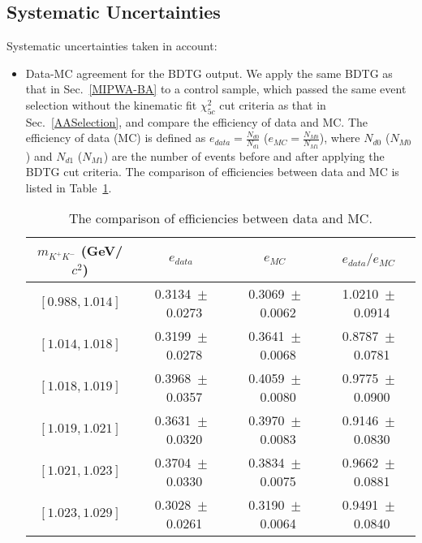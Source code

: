 \subsection{Systematic Uncertainties}
\label{MIPWA-SYS}
\par{
    Systematic uncertainties taken in account:
    \begin{itemize}
        \item \uppercase\expandafter{} Data-MC agreement for the BDTG output. 
            We apply the same BDTG as that in Sec.~\ref{MIPWA-BA} to a control sample, which passed the same event selection without the kinematic fit $\chi_{5c}^{2}$ cut criteria as that in Sec.~\ref{AASelection}, and compare the efficiency of data and MC.
            The efficiency of data (MC) is defined as $e_{data} = \frac{N_{d0}}{N_{d1}}$ ($e_{MC} = \frac{N_{M0}}{N_{M1}}$), where $N_{d0}$ ($N_{M0}$) and $N_{d1}$ ($N_{M1}$) are the number of events before and after applying the BDTG cut criteria.
            The comparison of efficiencies between data and MC is listed in Table~\ref{BDTG-SYS}.
            \begin{table}[htbp]
                \caption{The comparison of efficiencies between data and MC.}
                \label{BDTG-SYS}
                \begin{center}
                    \begin{tabular}{cccc}
                        \toprule\toprule
                        $m_{K^{+}K^{-}}$ (GeV/$c^{2}$) &  $e_{data} $ &  $e_{MC}$&  $e_{data} / e_{MC}$   \\
                        \hline
                        $[0.988, 1.014]$ &                0.3134\ $\pm$\ 0.0273 & 0.3069\ $\pm$\ 0.0062 & 1.0210\ $\pm$\ 0.0914 \\  
                        $[1.014, 1.018]$ &                0.3199\ $\pm$\ 0.0278 & 0.3641\ $\pm$\ 0.0068 & 0.8787\ $\pm$\ 0.0781 \\
                        $[1.018, 1.019]$ &                0.3968\ $\pm$\ 0.0357 & 0.4059\ $\pm$\ 0.0080 & 0.9775\ $\pm$\ 0.0900 \\
                        $[1.019, 1.021]$ &                0.3631\ $\pm$\ 0.0320 & 0.3970\ $\pm$\ 0.0083 & 0.9146\ $\pm$\ 0.0830 \\
                        $[1.021, 1.023]$ &                0.3704\ $\pm$\ 0.0330 & 0.3834\ $\pm$\ 0.0075 & 0.9662\ $\pm$\ 0.0881 \\
                        $[1.023, 1.029]$ &                0.3028\ $\pm$\ 0.0261 & 0.3190\ $\pm$\ 0.0064 & 0.9491\ $\pm$\ 0.0840 \\

\end{tabular}
\end{center}
\end{table}
\end{itemize}}
